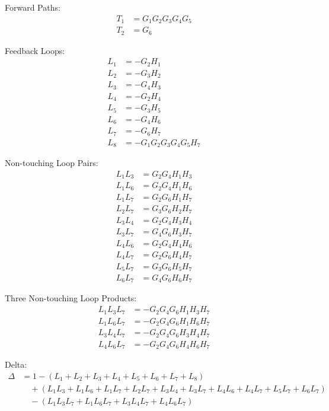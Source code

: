 \documentclass[11pt]{article}
\begin{document}
Forward Paths:
\begin{align*}
T_1 &= G_1 G_2 G_3 G_4 G_5 \\
T_2 &= G_6
\end{align*}

Feedback Loops:
\begin{align*}
L_1 &= -G_2 H_1 \\
L_2 &= -G_3 H_2 \\
L_3 &= -G_4 H_3 \\
L_4 &= -G_2 H_4 \\
L_5 &= -G_3 H_5 \\
L_6 &= -G_4 H_6 \\
L_7 &= -G_6 H_7 \\
L_8 &= -G_1 G_2 G_3 G_4 G_5 H_7
\end{align*}

Non-touching Loop Pairs:
\begin{align*}
L_1 L_3 &= G_2 G_4 H_1 H_3 \\
L_1 L_6 &= G_2 G_4 H_1 H_6 \\
L_1 L_7 &= G_2 G_6 H_1 H_7 \\
L_2 L_7 &= G_3 G_6 H_2 H_7 \\
L_3 L_4 &= G_2 G_4 H_3 H_4 \\
L_3 L_7 &= G_4 G_6 H_3 H_7 \\
L_4 L_6 &= G_2 G_4 H_4 H_6 \\
L_4 L_7 &= G_2 G_6 H_4 H_7 \\
L_5 L_7 &= G_3 G_6 H_5 H_7 \\
L_6 L_7 &= G_4 G_6 H_6 H_7
\end{align*}

Three Non-touching Loop Products:
\begin{align*}
L_1 L_3 L_7 &= -G_2 G_4 G_6 H_1 H_3 H_7 \\
L_1 L_6 L_7 &= -G_2 G_4 G_6 H_1 H_6 H_7 \\
L_3 L_4 L_7 &= -G_2 G_4 G_6 H_3 H_4 H_7 \\
L_4 L_6 L_7 &= -G_2 G_4 G_6 H_4 H_6 H_7
\end{align*}

Delta:
{\small
\begin{align*}
\Delta &= 1 - (L_1 + L_2 + L_3 + L_4 + L_5 + L_6 + L_7 + L_8) \\
&\quad + (L_1 L_3 + L_1 L_6 + L_1 L_7 + L_2 L_7 + L_3 L_4 + L_3 L_7 + L_4 L_6 + L_4 L_7 + L_5 L_7 + L_6 L_7) \\
&\quad - (L_1 L_3 L_7 + L_1 L_6 L_7 + L_3 L_4 L_7 + L_4 L_6 L_7)
\end{align*}
}
\end{document}
